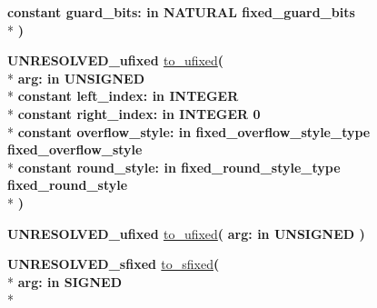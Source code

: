 \begin{DoxyCompactItemize}
{\bfseries {\bfseries \textcolor{keywordflow}{constant}\textcolor{vhdlchar}{ }}\textcolor{vhdlchar}{guard\+\_\+bits\+: }\textcolor{stringliteral}{in }\textcolor{vhdlchar}{N\+A\+T\+U\+R\+A\+L     fixed\+\_\+guard\+\_\+bits}}\\*
{\bfseries  )} 
\item 
{\bfseries {\bfseries \textcolor{vhdlchar}{U\+N\+R\+E\+S\+O\+L\+V\+E\+D\+\_\+ufixed}\textcolor{vhdlchar}{ }}} \hyperlink{class__fixed__pkg_a1c021bc528d8e3b63c69f6bf47c8053e}{to\+\_\+ufixed}{\bfseries  ( }\\*
{\bfseries \textcolor{vhdlchar}{arg\+: }\textcolor{stringliteral}{in }{\bfseries \textcolor{comment}{U\+N\+S\+I\+G\+N\+E\+D}\textcolor{vhdlchar}{ }}}\\*
{\bfseries {\bfseries \textcolor{keywordflow}{constant}\textcolor{vhdlchar}{ }}\textcolor{vhdlchar}{left\+\_\+index\+: }\textcolor{stringliteral}{in }{\bfseries \textcolor{comment}{I\+N\+T\+E\+G\+E\+R}\textcolor{vhdlchar}{ }}}\\*
{\bfseries {\bfseries \textcolor{keywordflow}{constant}\textcolor{vhdlchar}{ }}\textcolor{vhdlchar}{right\+\_\+index\+: }\textcolor{stringliteral}{in }\textcolor{vhdlchar}{I\+N\+T\+E\+G\+E\+R   0}}\\*
{\bfseries {\bfseries \textcolor{keywordflow}{constant}\textcolor{vhdlchar}{ }}\textcolor{vhdlchar}{overflow\+\_\+style\+: }\textcolor{stringliteral}{in }\textcolor{vhdlchar}{fixed\+\_\+overflow\+\_\+style\+\_\+type     fixed\+\_\+overflow\+\_\+style}}\\*
{\bfseries {\bfseries \textcolor{keywordflow}{constant}\textcolor{vhdlchar}{ }}\textcolor{vhdlchar}{round\+\_\+style\+: }\textcolor{stringliteral}{in }\textcolor{vhdlchar}{fixed\+\_\+round\+\_\+style\+\_\+type     fixed\+\_\+round\+\_\+style}}\\*
{\bfseries  )} 
\item 
{\bfseries {\bfseries \textcolor{vhdlchar}{U\+N\+R\+E\+S\+O\+L\+V\+E\+D\+\_\+ufixed}\textcolor{vhdlchar}{ }}} \hyperlink{class__fixed__pkg_a0540df42999977255e75bf7015888193}{to\+\_\+ufixed}{\bfseries  ( }{\bfseries \textcolor{vhdlchar}{arg\+: }\textcolor{stringliteral}{in }{\bfseries \textcolor{comment}{U\+N\+S\+I\+G\+N\+E\+D}\textcolor{vhdlchar}{ }}}{\bfseries  )} 
\item 
{\bfseries {\bfseries \textcolor{vhdlchar}{U\+N\+R\+E\+S\+O\+L\+V\+E\+D\+\_\+sfixed}\textcolor{vhdlchar}{ }}} \hyperlink{class__fixed__pkg_a440e389275888b28c0eff1c60223a3d0}{to\+\_\+sfixed}{\bfseries  ( }\\*
{\bfseries \textcolor{vhdlchar}{arg\+: }\textcolor{stringliteral}{in }{\bfseries \textcolor{comment}{S\+I\+G\+N\+E\+D}\textcolor{vhdlchar}{ }}}\\*

\end{DoxyCompactItemize}
